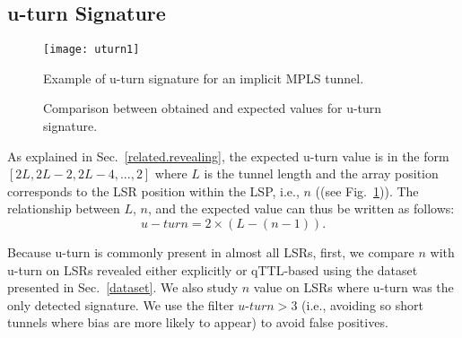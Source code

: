\subsection{u-turn Signature}\label{validation.uturn}

\begin{figure}[!t]
  \begin{center}
    \texttt{[image: uturn1]}
  \end{center}
  \caption{Example of u-turn signature for an implicit MPLS tunnel.}
  \label{validation.uturn1Fig}
\end{figure}

\begin{figure}[!t]
  \begin{center}    
\hspace{-0.3cm}      
  \end{center}
  \caption{Comparison between obtained and expected values for u-turn
  signature.}
  \label{validation.uturn.fig}
\end{figure}

As explained in Sec.~\ref{related.revealing},  the expected u-turn value is in
the form $[2L, 2L-2, 2L-4,..., 2]$ where $L$ is the tunnel length and the array
position corresponds to the LSR position within the LSP, i.e., $n$ ((see Fig.~\ref{validation.uturn1Fig})).  The
relationship between $L$, $n$, and the expected value can thus be written as
follows:
\begin{equation}
u-turn = 2 \times (L - (n-1)) .
\label{eqn.uturn}
\end{equation}



Because u-turn is commonly present in almost all LSRs, first, we compare $n$
with u-turn on LSRs revealed either explicitly or qTTL-based using the dataset
presented in Sec.~\ref{dataset}.  We also study  $n$ value on LSRs where u-turn
was the only detected signature. We use the filter $\textit{u-turn}>3$ (i.e.,
avoiding so short tunnels where bias are more likely to appear) to avoid false
positives.

